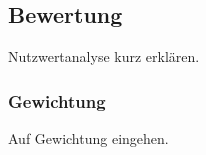\subsection{Bewertung}
Nutzwertanalyse kurz erklären.

\subsubsection{Gewichtung}
Auf Gewichtung eingehen.